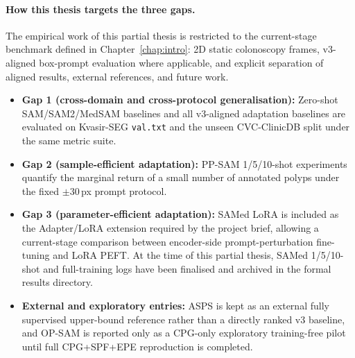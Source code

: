 \paragraph{How this thesis targets the three gaps.}
The empirical work of this partial thesis is restricted to the current-stage benchmark defined in Chapter~\ref{chap:intro}: 2D static colonoscopy frames, v3-aligned box-prompt evaluation where applicable, and explicit separation of aligned results, external references, and future work.
\begin{itemize}
    \item \textbf{Gap 1 (cross-domain and cross-protocol generalisation):} Zero-shot SAM/SAM2/MedSAM baselines and all v3-aligned adaptation baselines are evaluated on Kvasir-SEG \texttt{val.txt} and the unseen CVC-ClinicDB split under the same metric suite.
    \item \textbf{Gap 2 (sample-efficient adaptation):} PP-SAM 1/5/10-shot experiments quantify the marginal return of a small number of annotated polyps under the fixed $\pm30$\,px prompt protocol.
    \item \textbf{Gap 3 (parameter-efficient adaptation):} SAMed LoRA is included as the Adapter/LoRA extension required by the project brief, allowing a current-stage comparison between encoder-side prompt-perturbation fine-tuning and LoRA PEFT. At the time of this partial thesis, SAMed 1/5/10-shot and full-training logs have been finalised and archived in the formal results directory.
    \item \textbf{External and exploratory entries:} ASPS is kept as an external fully supervised upper-bound reference rather than a directly ranked v3 baseline, and OP-SAM is reported only as a CPG-only exploratory training-free pilot until full CPG+SPF+EPE reproduction is completed.
\end{itemize}

